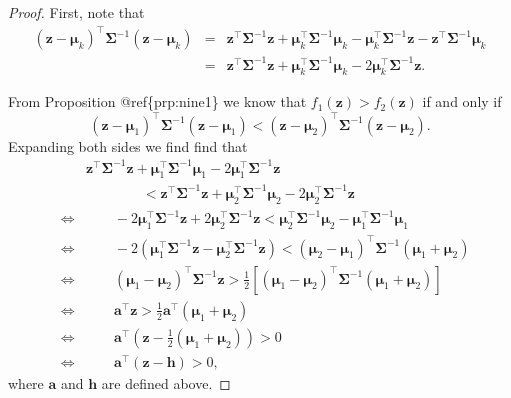 \documentclass[]{book}
\theoremstyle{definition}
\theoremstyle{definition}
\theoremstyle{definition}
\theoremstyle{remark}
\begin{document}
\begin{proof}
{}First, note that
\begin{eqnarray*}
(\boldsymbol z-\boldsymbol \mu_k)^\top \boldsymbol \Sigma^{-1} (\boldsymbol z-\boldsymbol \mu_k) &=& \boldsymbol z^\top \boldsymbol \Sigma^{-1} \boldsymbol z+ \boldsymbol \mu_k^\top \boldsymbol \Sigma^{-1} \boldsymbol \mu_k - \boldsymbol \mu_k^\top \boldsymbol \Sigma^{-1} \boldsymbol z- \boldsymbol z^\top \boldsymbol \Sigma^{-1} \boldsymbol \mu_k \\
&=& \boldsymbol z^\top \boldsymbol \Sigma^{-1} \boldsymbol z+ \boldsymbol \mu_k^\top \boldsymbol \Sigma^{-1} \boldsymbol \mu_k - 2\boldsymbol \mu_k^\top \boldsymbol \Sigma^{-1} \boldsymbol z.
\end{eqnarray*}

From Proposition @ref\{prp:nine1\} we know that \(f_1(\boldsymbol z) > f_2(\boldsymbol z)\) if and only if
\[
(\boldsymbol z-\boldsymbol \mu_1)^\top \boldsymbol \Sigma^{-1} (\boldsymbol z-\boldsymbol \mu_1) < (\boldsymbol z-\boldsymbol \mu_2)^\top \boldsymbol \Sigma^{-1} (\boldsymbol z-\boldsymbol \mu_2).
\]
Expanding both sides we find find that
\begin{eqnarray*}
&&\boldsymbol z^\top \boldsymbol \Sigma^{-1} \boldsymbol z+ \boldsymbol \mu_1^\top \boldsymbol \Sigma^{-1} \boldsymbol \mu_1 - 2\boldsymbol \mu_1^\top \boldsymbol \Sigma^{-1} \boldsymbol z\\
 && \qquad \qquad < \boldsymbol z^\top \boldsymbol \Sigma^{-1} \boldsymbol z+ \boldsymbol \mu_2^\top \boldsymbol \Sigma^{-1} \boldsymbol \mu_2 - 2\boldsymbol \mu_2^\top \boldsymbol \Sigma^{-1} \boldsymbol z\\
& \iff& \qquad - 2\boldsymbol \mu_1^\top \boldsymbol \Sigma^{-1} \boldsymbol z+ 2\boldsymbol \mu_2^\top \boldsymbol \Sigma^{-1} \boldsymbol z< \boldsymbol \mu_2^\top \boldsymbol \Sigma^{-1} \boldsymbol \mu_2 - \boldsymbol \mu_1^\top \boldsymbol \Sigma^{-1} \boldsymbol \mu_1 \\
& \iff & \qquad - 2 \left(\boldsymbol \mu_1^\top \boldsymbol \Sigma^{-1} \boldsymbol z- \boldsymbol \mu_2^\top \boldsymbol \Sigma^{-1} \boldsymbol z\right)< (\boldsymbol \mu_2-\boldsymbol \mu_1)^\top \boldsymbol \Sigma^{-1} (\boldsymbol \mu_1+\boldsymbol \mu_2) \\
& \iff & \qquad (\boldsymbol \mu_1 - \boldsymbol \mu_2)^\top \boldsymbol \Sigma^{-1} \boldsymbol z> \frac{1}{2} \left[(\boldsymbol \mu_1-\boldsymbol \mu_2)^\top \boldsymbol \Sigma^{-1} (\boldsymbol \mu_1+\boldsymbol \mu_2) \right]\\
& \iff & \qquad \boldsymbol a^\top \boldsymbol z> \frac{1}{2} \boldsymbol a^\top (\boldsymbol \mu_1+\boldsymbol \mu_2) \\
& \iff & \qquad \boldsymbol a^\top \left(\boldsymbol z- \frac{1}{2}  (\boldsymbol \mu_1+\boldsymbol \mu_2) \right)> 0 \\
& \iff & \qquad \boldsymbol a^\top (\boldsymbol z-\boldsymbol h) > 0,
\end{eqnarray*}
where \(\boldsymbol a\) and \(\boldsymbol h\) are defined above.
\end{proof}
\end{document}
